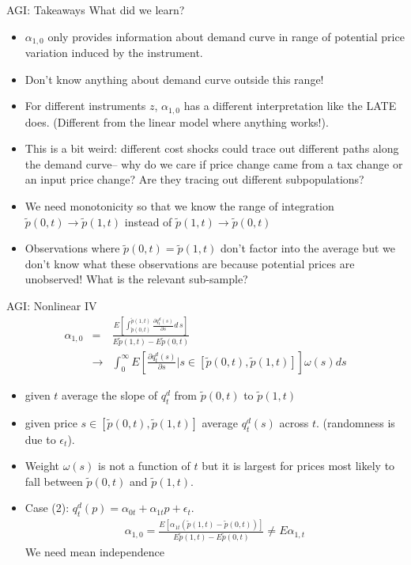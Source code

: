 \documentclass[xcolor=pdftex,dvipsnames,table,mathserif]{beamer}
\begin{document}
\begin{frame}{AGI: Takeaways}
What did we learn?
\begin{itemize}
\item $\alpha_{1,0}$ only provides information about demand curve in range of potential price variation induced by the instrument.
\item Don't know anything about demand curve outside this range!
\item For different instruments $z$, $\alpha_{1,0}$ has a different interpretation like the LATE does. (Different from the linear model where anything works!).
\item This is a bit weird: different cost shocks could trace out different paths along the demand curve-- why do we care if price change came from a tax change or an input price change? Are they tracing out different subpopulations?
\item We need monotonicity so that we know the range of integration $\tilde{p}(0,t) \rightarrow \tilde{p}(1,t)$ instead of $\tilde{p}(1,t) \rightarrow \tilde{p}(0,t)$
\item Observations where $\tilde{p}(0,t) = \tilde{p}(1,t)$ don't factor into the average but we don't know what these observations are because potential prices are unobserved! What is the relevant sub-sample?
\end{itemize}
\end{frame}




\begin{frame}{AGI: Nonlinear IV}
\begin{eqnarray*}
\alpha_{1,0} &=& \frac{E [ \int_{\tilde{p}(0,t)}^{\tilde{p}(1,t)} \frac{\partial q_t^d(s)}{\partial s} d\, s]}{E \tilde{p}(1,t)- E\tilde{p}(0,t)}\\
 &\rightarrow& \int_0^{\infty} E\left[ \frac{\partial q_t^d(s)}{\partial s} | s \in [\tilde{p}(0,t),\tilde{p}(1,t)]\right ] \omega(s) d  s
\end{eqnarray*}

\begin{itemize}
\item given $t$ average the slope of $q_t^d$ from $\tilde{p}(0,t)$ to $\tilde{p}(1,t)$
\item given price $s \in [\tilde{p}(0,t) ,\tilde{p}(1,t)]$ average $q_t^d(s)$ across $t$. (randomness is due to $\epsilon_t$).
\item Weight $\omega(s)$ is not a function of $t$ but it is largest for prices most likely to fall between $\tilde{p}(0,t)$ and $\tilde{p}(1,t)$.
\item Case (2): $q_t^d(p) = \alpha_{0t} + \alpha_{1t} p + \epsilon_t$.
\begin{eqnarray*}
\alpha_{1,0} = \frac{E[\alpha_{1t} (\tilde{p}(1,t) - \tilde{p}(0,t))]}{E \tilde{p}(1,t) - E \tilde{p}(0,t)} \neq E \alpha_{1,t}
\end{eqnarray*}
We need mean independence
\end{itemize}
\end{frame}
\end{document}
